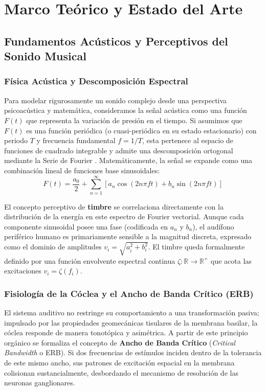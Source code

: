 \chapter{Marco Teórico y Estado del Arte}
\label{chap:marco_teorico}

\section{Fundamentos Acústicos y Perceptivos del Sonido Musical}
\label{sec:fundamentos_acusticos}

\subsection{Física Acústica y Descomposición Espectral}
Para modelar rigurosamente un sonido complejo desde una perspectiva psicoacústica y matemática, consideramos la señal acústica como una función $F(t)$ que representa la variación de presión en el tiempo. Si asumimos que $F(t)$ es una función periódica (o cuasi-periódica en su estado estacionario) con periodo $T$ y frecuencia fundamental $f = 1/T$, esta pertenece al espacio de funciones de cuadrado integrable y admite una descomposición ortogonal mediante la Serie de Fourier \cite{Cook_2009}. Matemáticamente, la señal se expande como una combinación lineal de funciones base sinusoidales:
\begin{equation}
    F(t) = \frac{a_0}{2} + \sum_{n=1}^\infty \left[ a_n \cos(2n\pi f t) + b_n \sin(2n\pi f t) \right]
\end{equation}

El concepto perceptivo de \textbf{timbre} se correlaciona directamente con la distribución de la energía en este espectro de Fourier vectorial. Aunque cada componente sinusoidal posee una fase (codificada en $a_n$ y $b_n$), el audífono periférico humano es primariamente sensible a la magnitud discreta, expresado como el dominio de amplitudes $v_i = \sqrt{a_i^2 + b_i^2}$. El timbre queda formalmente definido por una función envolvente espectral continua $\zeta: \mathbb{R} \to \mathbb{R}^+$ que acota las excitaciones $v_i = \zeta(f_i)$.

\subsection{Fisiología de la Cóclea y el Ancho de Banda Crítico (ERB)}
El sistema auditivo no restringe su comportamiento a una transformación pasiva; impulsado por las propiedades geomecánicas tisulares de la membrana basilar, la cóclea responde de manera tonotópica y asimétrica. A partir de este principio orgánico se formaliza el concepto de \textbf{Ancho de Banda Crítico} (\textit{Critical Bandwidth} o ERB). Si dos frecuencias de estímulos inciden dentro de la tolerancia de este mismo ancho, sus patrones de excitación espacial en la membrana colisionan sustancialmente, desbordando el mecanismo de resolución de las neuronas ganglionares.

